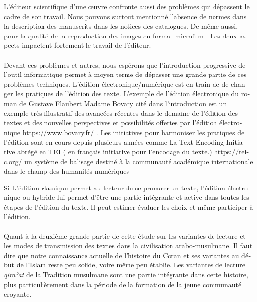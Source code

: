 \documentclass[a4paper,12pt]{report}
\begin{document}
\begin{french}
L'éditeur scientifique d'une œuvre confronte aussi des problèmes qui dépassent le cadre de son travail. Nous pouvons surtout mentionné l'absence de normes dans  la  description des manuscrits dans les notices des catalogues.  De même aussi, pour  la qualité de la  reproduction des images en format microfilm . Les deux aspects impactent fortement le travail de l'éditeur. 

\paragraph{}
Devant ces problèmes et autres, nous espérons  que l'introduction progressive  de l'outil informatique  permet  à moyen  terme de dépasser  une grande partie de ces problèmes techniques. L'édition électronique/numérique est en train de de changer les pratiques de l'édition des texte.  L'exemple de l'édition électronique du roman de Gustave Flaubert Madame Bovary cité dans l'introduction est un exemple très illustratif des avancées récentes dans le domaine de l'édition des textes et des nouvelles perspectives et possibilités offertes par l'édition électronique  \url{https://www.bovary.fr/} . Les initiatives pour harmoniser  les pratiques de l'édition sont en cours  depuis plusieurs années comme  
La Text Encoding Initiative abrégé en TEI  ( en français  initiative pour l’encodage du texte.) \url{https://tei-c.org/}  un système de  balisage destiné à la communauté académique internationale dans le champ des humanités numériques

 Si L'édition classique permet  au lecteur  de se procurer un  texte, l'édition électronique ou hybride  lui permet d'être une partie intégrante et active dans toutes les étapes de l'édition du texte. Il peut estimer  évaluer les choix  et même participer à l'édition. 
 
\paragraph{}
Quant à la deuxième grande partie de cette étude  sur les variantes de lecture et les modes de transmission des textes dans la civilisation arabo-musulmane. Il faut dire que notre connaissance actuelle de l'histoire du Coran  et ses variantes au début de l'Islam reste peu solide, voire même peu établie. Les  variantes de lecture \textit{qirāʾāt} de  la Tradition musulmane sont une partie intégrante dans cette histoire, plus particulièrement dans la période de la formation  de la jeune communauté croyante.
 

\end{french}
\end{document}
